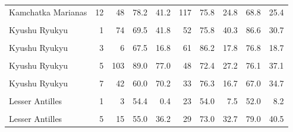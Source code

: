 \begin{ThreePartTable}
\begin{longtable}[t]{lrrrrrrrrr}
Kamchatka Marianas & 12 & 48 & 78.2 & 41.2 & 117 & 75.8 & 24.8 & 68.8 & 25.4\\
\cellcolor{gray!6}{Kamchatka Marianas} & \cellcolor{gray!6}{13} & \cellcolor{gray!6}{55} & \cellcolor{gray!6}{68.0} & \cellcolor{gray!6}{32.5} & \cellcolor{gray!6}{108} & \cellcolor{gray!6}{75.5} & \cellcolor{gray!6}{27.1} & \cellcolor{gray!6}{61.1} & \cellcolor{gray!6}{28.9}\\
Kyushu Ryukyu & 1 & 74 & 69.5 & 41.8 & 52 & 75.8 & 40.3 & 86.6 & 30.7\\
\cellcolor{gray!6}{Kyushu Ryukyu} & \cellcolor{gray!6}{2} & \cellcolor{gray!6}{25} & \cellcolor{gray!6}{80.0} & \cellcolor{gray!6}{40.0} & \cellcolor{gray!6}{43} & \cellcolor{gray!6}{77.6} & \cellcolor{gray!6}{13.1} & \cellcolor{gray!6}{75.4} & \cellcolor{gray!6}{28.6}\\
Kyushu Ryukyu & 3 & 6 & 67.5 & 16.8 & 61 & 86.2 & 17.8 & 76.8 & 18.7\\
\cellcolor{gray!6}{Kyushu Ryukyu} & \cellcolor{gray!6}{4} & \cellcolor{gray!6}{28} & \cellcolor{gray!6}{77.5} & \cellcolor{gray!6}{26.2} & \cellcolor{gray!6}{43} & \cellcolor{gray!6}{84.9} & \cellcolor{gray!6}{24.6} & \cellcolor{gray!6}{77.6} & \cellcolor{gray!6}{45.2}\\
Kyushu Ryukyu & 5 & 103 & 89.0 & 77.0 & 48 & 72.4 & 27.2 & 76.1 & 37.1\\
\cellcolor{gray!6}{Kyushu Ryukyu} & \cellcolor{gray!6}{6} & \cellcolor{gray!6}{25} & \cellcolor{gray!6}{126.0} & \cellcolor{gray!6}{94.0} & \cellcolor{gray!6}{39} & \cellcolor{gray!6}{80.4} & \cellcolor{gray!6}{19.0} & \cellcolor{gray!6}{96.0} & \cellcolor{gray!6}{57.6}\\
Kyushu Ryukyu & 7 & 42 & 60.0 & 70.2 & 33 & 76.3 & 16.7 & 67.0 & 34.7\\
\cellcolor{gray!6}{Kyushu Ryukyu} & \cellcolor{gray!6}{8} & \cellcolor{gray!6}{36} & \cellcolor{gray!6}{43.4} & \cellcolor{gray!6}{30.8} & \cellcolor{gray!6}{23} & \cellcolor{gray!6}{62.1} & \cellcolor{gray!6}{37.6} & \cellcolor{gray!6}{55.3} & \cellcolor{gray!6}{33.8}\\
Lesser Antilles & 1 & 3 & 54.4 & 0.4 & 23 & 54.0 & 7.5 & 52.0 & 8.2\\
\cellcolor{gray!6}{Lesser Antilles} & \cellcolor{gray!6}{3} & \cellcolor{gray!6}{10} & \cellcolor{gray!6}{38.1} & \cellcolor{gray!6}{31.9} & \cellcolor{gray!6}{20} & \cellcolor{gray!6}{57.7} & \cellcolor{gray!6}{24.0} & \cellcolor{gray!6}{63.4} & \cellcolor{gray!6}{18.0}\\
Lesser Antilles & 5 & 15 & 55.0 & 36.2 & 29 & 73.0 & 32.7 & 79.0 & 40.5\\

\end{longtable}
\end{ThreePartTable}
